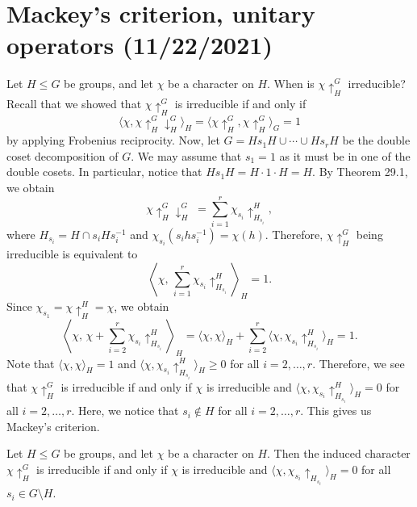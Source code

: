 \section{Mackey's criterion, unitary operators (11/22/2021)}
Let $H \leq G$ be groups, and let $\chi$ be a character on $H$. 
When is $\chi \uparrow_H^G$ irreducible? Recall that we showed that 
$\chi \uparrow_H^G$ is irreducible if and only if 
\[ \langle \chi, \chi \uparrow_H^G \downarrow_H^G \rangle_H = 
\langle \chi \uparrow_H^G, \chi \uparrow_H^G \rangle_G = 1 \] 
by applying Frobenius reciprocity. Now, let $G = Hs_1H \cup \cdots 
\cup Hs_rH$ be the double coset decomposition of $G$. We may assume that 
$s_1 = 1$ as it must be in one of the double cosets. In particular, 
notice that $Hs_1 H = H \cdot 1 \cdot H = H$. By Theorem 29.1, we obtain 
\[ \chi \uparrow_H^G \downarrow_H^G\; = \sum_{i=1}^r \chi_{s_i} \uparrow_{H_{s_i}}^H, \] 
where $H_{s_i} = H \cap s_i H s_i^{-1}$ and $\chi_{s_i}(s_ihs_i^{-1}) = \chi(h)$. 
Therefore, $\chi \uparrow_H^G$ being irreducible is equivalent to 
\[ \left\langle \chi,\,\sum_{i=1}^r \chi_{s_i} \uparrow_{H_{s_i}}^H \right\rangle_{\!\!H} = 1. \] 
Since $\chi_{s_1} = \chi \uparrow_H^H = \chi$, we obtain 
\[ \left\langle \chi,\, \chi + \sum_{i=2}^r \chi_{s_i} \uparrow_{H_{s_i}}^H \right\rangle_{\!\!H} 
= \langle \chi, \chi \rangle_H + \sum_{i=2}^r \langle \chi, \chi_{s_i} \uparrow_{H_{s_i}}^H \rangle_H = 1. \] 
Note that $\langle \chi, \chi \rangle_H = 1$ and $\langle \chi, \chi_{s_i} \uparrow_{H_{s_i}}^H \rangle_H \geq 0$ 
for all $i = 2, \dots, r$. Therefore, we see that $\chi \uparrow_H^G$ is 
irreducible if and only if $\chi$ is irreducible and $\langle \chi, 
\chi_{s_i} \uparrow_{H_{s_i}}^H \rangle_H = 0$ for all $i = 2, \dots, r$. 
Here, we notice that $s_i \notin H$ for all $i = 2, \dots, r$. This gives 
us Mackey's criterion. 

\begin{theo}{}
    Let $H \leq G$ be groups, and let $\chi$ be a character on $H$. Then 
    the induced character $\chi \uparrow_H^G$ is irreducible if and only if 
    $\chi$ is irreducible and $\langle \chi, \chi_{s_i} \uparrow_{H_{s_i}} \rangle_H = 0$
    for all $s_i \in G \setminus H$. 
\end{theo}


